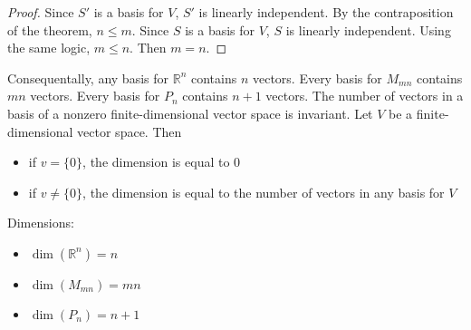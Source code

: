 \documentclass[12pt]{article}
\begin{document}
\begin{proof} Since $S'$ is a basis for $V$, $S'$ is linearly independent. By the contraposition of the theorem, $n \leq m$. Since $S$ is a basis for $V$, $S$ is linearly independent. Using the same logic, $m \leq n$. Then $m = n$. \end{proof} 
Consequentally, any basis for $\mathbb{R}^n$ contains $n$ vectors. Every basis for $M_{mn}$ contains $mn$ vectors. Every basis for $P_n$ contains $n + 1$ vectors. The number of vectors in a basis of a nonzero finite-dimensional vector space is invariant. \newline
Let $V$ be a finite-dimensional vector space. Then \begin{itemize} 
\item if $v = \{0\}$, the dimension is equal to 0 
\item if $v \neq \{0\}$, the dimension is equal to the number of vectors in any basis for $V$ \end{itemize} 
Dimensions: \begin{itemize} 
\item $\dim(\mathbb{R}^n) = n$ \item $\dim(M_{mn}) = mn$ \item $\dim(P_n) = n + 1$ \end{itemize} 
\end{document}
